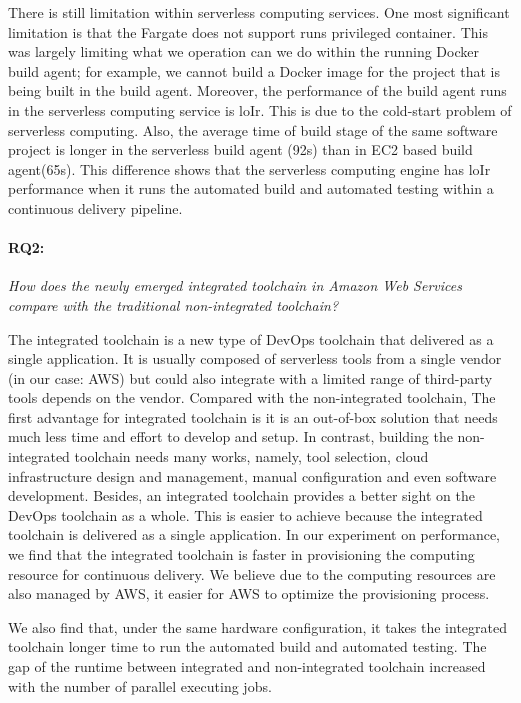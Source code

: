 There is still limitation within serverless computing services. One most significant limitation is that the Fargate does not support runs privileged container. This was largely limiting what we operation can we do within the running Docker build agent; for example, we cannot build a Docker image for the project that is being built in the build agent. Moreover, the performance of the build agent runs in the serverless computing service is loIr. This is due to the cold-start problem of serverless computing. Also, the average time of build stage of the same software project is longer in the serverless build agent (92s) than in EC2 based build agent(65s). This difference shows that the serverless computing engine has loIr performance when it runs the automated build and automated testing within a continuous delivery pipeline.
\paragraph{RQ2:} \textit{How does the newly emerged integrated toolchain in Amazon Web Services compare with the traditional non-integrated toolchain?}
\medskip
\par
The integrated toolchain is a new type of DevOps toolchain that delivered as a single application. It is usually composed of serverless tools from a single vendor (in our case: AWS) but could also integrate with a limited range of third-party tools depends on the vendor. Compared with the non-integrated toolchain, The first advantage for integrated toolchain is it is an out-of-box solution that needs much less time and effort to develop and setup. In contrast, building the non-integrated toolchain needs many works, namely, tool selection, cloud infrastructure design and management, manual configuration and even software development. Besides, an integrated toolchain provides a better sight on the DevOps toolchain as a whole. This is easier to achieve because the integrated toolchain is delivered as a single application. In our experiment on performance, we find that the integrated toolchain is faster in provisioning the computing resource for continuous delivery. We believe due to the computing resources are also managed by AWS, it easier for AWS to optimize the provisioning process.
\par
We also find that, under the same hardware configuration, it takes the integrated toolchain longer time to run the automated build and automated testing. The gap of the runtime between integrated and non-integrated toolchain increased with the number of parallel executing jobs.
